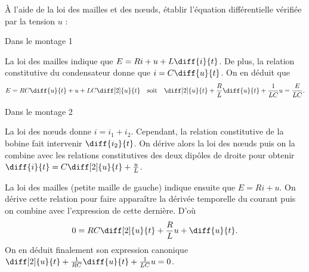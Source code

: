 \debutEntrainement

À l'aide de la loi des mailles et des n\oe uds, établir l'équation différentielle vérifiée par la tension $u$ : 



\begin{enonce}
Dans le montage 1
\end{enonce}


\begin{corrige}
La loi des mailles indique que $E = R i + u + L \diff{i}{t}$. De plus, la relation constitutive du condensateur donne que $i = C \diff{u}{t}$. On en déduit que
\[
E = RC \diff{u}{t} + u + LC \diff[2]{u}{t}
\quad\text{soit}\quad
\diff[2]{u}{t} + \frac{R}{L} \diff{u}{t} + \frac{1}{LC} u  = \frac{E}{LC}.
\]
\end{corrige}




\begin{enonce}
Dans le montage 2
\end{enonce}


\begin{corrige}
La loi des nœuds donne $i = i_1 + i_2$. Cependant, la relation constitutive de la bobine fait intervenir $\diff{i_2}{t}$. On dérive alors la loi des nœuds puis on la combine avec les relations constitutives des deux dipôles de droite pour obtenir $\diff{i}{t} = C \diff[2]{u}{t} + \frac{u}{L}$.
\par
La loi des mailles (petite maille de gauche) indique ensuite que $E = Ri + u$. On dérive cette relation pour faire apparaître la dérivée temporelle du courant puis on combine avec l'expression de cette dernière. D'où 
\[
0 = RC \diff[2]{u}{t} + \frac{R}{L}u + \diff{u}{t}.
\]
On en déduit finalement son expression canonique $  \diff[2]{u}{t} +  \frac{1}{RC}\diff{u}{t}  + \frac{1}{LC}u = 0$.
\end{corrige}

